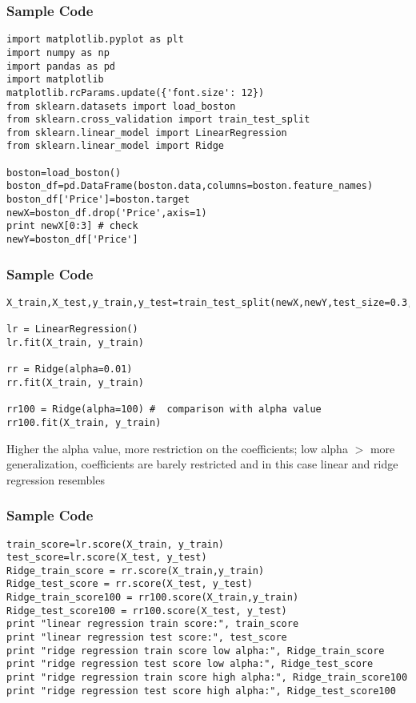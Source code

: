 \begin{frame}[fragile]\frametitle{Sample Code}

\begin{lstlisting}
import matplotlib.pyplot as plt
import numpy as np 
import pandas as pd
import matplotlib
matplotlib.rcParams.update({'font.size': 12})
from sklearn.datasets import load_boston
from sklearn.cross_validation import train_test_split
from sklearn.linear_model import LinearRegression
from sklearn.linear_model import Ridge

boston=load_boston()
boston_df=pd.DataFrame(boston.data,columns=boston.feature_names)
boston_df['Price']=boston.target
newX=boston_df.drop('Price',axis=1)
print newX[0:3] # check 
newY=boston_df['Price']
\end{lstlisting}
\end{frame}

\begin{frame}[fragile]\frametitle{Sample Code}

\begin{lstlisting}
X_train,X_test,y_train,y_test=train_test_split(newX,newY,test_size=0.3,random_state=3)

lr = LinearRegression()
lr.fit(X_train, y_train)

rr = Ridge(alpha=0.01) 
rr.fit(X_train, y_train)

rr100 = Ridge(alpha=100) #  comparison with alpha value
rr100.fit(X_train, y_train)
\end{lstlisting}

Higher the alpha value, more restriction on the coefficients; low alpha $>$ more generalization, coefficients are barely restricted and in this case linear and ridge regression resembles
\end{frame}



\begin{frame}[fragile]\frametitle{Sample Code}

\begin{lstlisting}
train_score=lr.score(X_train, y_train)
test_score=lr.score(X_test, y_test)
Ridge_train_score = rr.score(X_train,y_train)
Ridge_test_score = rr.score(X_test, y_test)
Ridge_train_score100 = rr100.score(X_train,y_train)
Ridge_test_score100 = rr100.score(X_test, y_test)
print "linear regression train score:", train_score
print "linear regression test score:", test_score
print "ridge regression train score low alpha:", Ridge_train_score
print "ridge regression test score low alpha:", Ridge_test_score
print "ridge regression train score high alpha:", Ridge_train_score100
print "ridge regression test score high alpha:", Ridge_test_score100
\end{lstlisting}

\end{frame}


